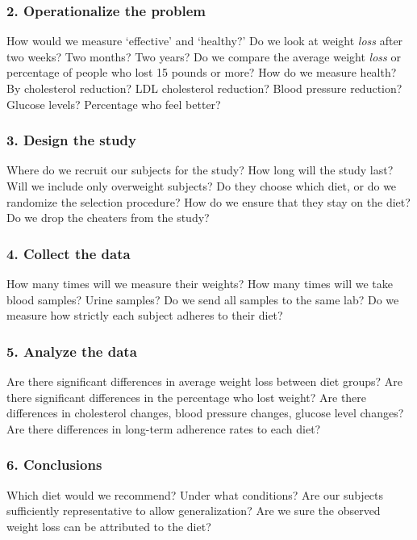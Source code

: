 \documentclass[11pt]{book}\usepackage[]{graphicx}\usepackage[]{color}
\begin{document}
\subsubsection{2.	Operationalize the problem}

How would we measure `effective' and `healthy?'  Do we look at weight \textit{loss} after two weeks? Two months?  Two years?  Do we compare the average weight \textit{loss} or percentage of people who lost 15 pounds or more?  How do we measure health?  By cholesterol reduction?  LDL cholesterol reduction?  Blood pressure reduction?  Glucose levels?  Percentage who feel better?

\subsubsection{3.	Design the study}

Where do we recruit our subjects for the study? How long will the study last?  Will we include only overweight subjects?  Do they choose which diet, or do we randomize the selection procedure?  How do we ensure that they stay on the diet?  Do we drop the cheaters from the study?

\subsubsection{4.	Collect the data}

How many times will we measure their weights?  How many times will we take blood samples?  Urine samples?  Do we send all samples to the same lab?  Do we measure how strictly each subject adheres to their diet?

\subsubsection{5.	Analyze the data}

Are there significant differences in average weight loss between diet groups?  Are there significant differences in the percentage who lost weight?  Are there differences in cholesterol changes, blood pressure changes, glucose level changes?  Are there differences in long-term adherence rates to each diet?

\subsubsection{6.	Conclusions}

Which diet would we recommend?  Under what conditions? Are our subjects sufficiently representative to allow generalization?  Are we sure the observed weight loss can be attributed to the diet?
\end{document}
